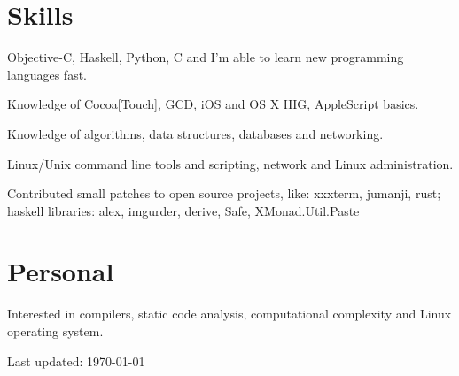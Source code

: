 \documentclass[letterpaper]{article}
\def\footerlink{}
\renewenvironment{itemize}{
  \begin{list}{}{
    \setlength{\leftmargin}{1.5em}
  }
}{
  \end{list}
}
\begin{document}
\section*{Skills}
\begin{itemize}
	\item Objective-C, Haskell, Python, C and I'm able to learn new programming languages fast.
	\item Knowledge of Cocoa[Touch], GCD, iOS and OS X HIG, AppleScript basics.
	\item Knowledge of algorithms, data structures, databases and networking.
	\item Linux/Unix command line tools and scripting, network and Linux administration.
	\item Contributed small patches to open source projects, like: xxxterm, jumanji, rust;\\
		 haskell libraries: alex, imgurder, derive, Safe, XMonad.Util.Paste
\end{itemize}

\section*{Personal}

\begin{itemize}
	\item Interested in compilers, static code analysis, computational complexity and Linux operating system.
\end{itemize}

\bigskip

\begin{center}
  \begin{footnotesize}
    Last updated: \today \\
    \href{\footerlink}{\texttt{\footerlink}}
  \end{footnotesize}
\end{center}
\end{document}
